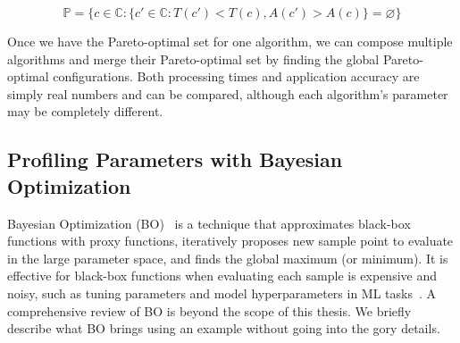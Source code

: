 {\small \vspace{-1em}
  \begin{equation}
    \mathbb{P} = \{ c \in \mathbb{C} : \{ c' \in \mathbb{C}: T(c') < T(c),
    A(c') > A(c) \} = \varnothing\}
  \label{eq:pareto2}
\end{equation}
}%

Once we have the Pareto-optimal set for one algorithm, we can compose multiple
algorithms and merge their Pareto-optimal set by finding the global
Pareto-optimal configurations. Both processing times and application accuracy
are simply real numbers and can be compared, although each algorithm's parameter
may be completely different.

\subsection{Profiling Parameters with Bayesian Optimization}
\label{sec:prof-param-with}

Bayesian Optimization (BO)~\cite{snoek2012practical} is a technique that
approximates black-box functions with proxy functions, iteratively proposes new
sample point to evaluate in the large parameter space, and finds the global
maximum (or minimum). It is effective for black-box functions when evaluating
each sample is expensive and noisy, such as tuning parameters and model
hyperparameters in ML tasks~\cite{snoek2012practical}. A comprehensive review of
BO is beyond the scope of this thesis. We briefly describe what BO brings using
an example without going into the gory details.

